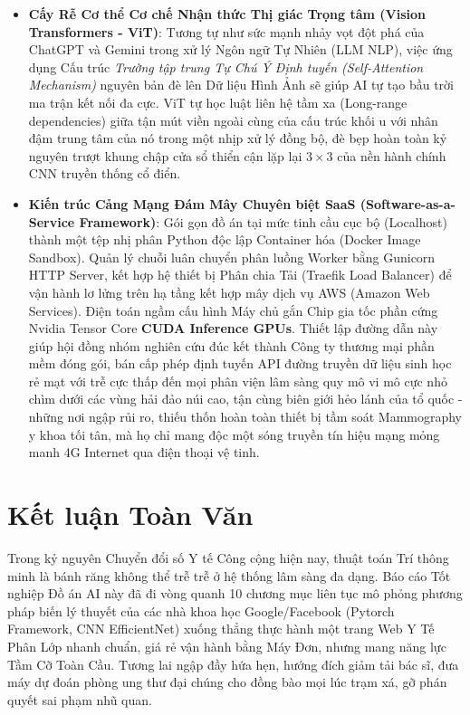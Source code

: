 \documentclass[conference,a4paper]{IEEEtran}
\begin{document}
\begin{itemize}
\item \textbf{Cấy Rễ Cơ thể Cơ chế Nhận thức Thị giác Trọng tâm (Vision Transformers - ViT)}: Tương tự như sức mạnh nhảy vọt đột phá của ChatGPT và Gemini trong xử lý Ngôn ngữ Tự Nhiên (LLM NLP), việc ứng dụng Cấu trúc \textit{Trường tập trung Tự Chú Ý Định tuyến (Self-Attention Mechanism)} nguyên bản đè lên Dữ liệu Hình Ảnh sẽ giúp AI tự tạo bầu trời ma trận kết nối đa cực. ViT tự học luật liên hệ tầm xa (Long-range dependencies) giữa tận mút viền ngoài cùng của cấu trúc khối u với nhân đậm trung tâm của nó trong một nhịp xử lý đồng bộ, đè bẹp hoàn toàn kỷ nguyên trượt khung chập cửa sổ thiển cận lặp lại $3 \times 3$ của nền hành chính CNN truyền thống cổ điển.
\item \textbf{Kiến trúc Cảng Mạng Đám Mây Chuyên biệt SaaS (Software-as-a-Service Framework)}: Gói gọn đồ án tại mức tinh cầu cục bộ (Localhost) thành một tệp nhị phân Python độc lập Container hóa (Docker Image Sandbox). Quản lý chuỗi luân chuyển phân luồng Worker bằng Gunicorn HTTP Server, kết hợp hệ thiết bị Phân chia Tải (Traefik Load Balancer) để vận hành lơ lửng trên hạ tầng kết hợp mây dịch vụ AWS (Amazon Web Services). Điện toán ngầm cấu hình Máy chủ gắn Chip gia tốc phần cứng Nvidia Tensor Core \textbf{CUDA Inference GPUs}. Thiết lập đường dẫn này giúp hội đồng nhóm nghiên cứu đúc kết thành Công ty thương mại phần mềm đóng gói, bán cấp phép định tuyến API đường truyền dữ liệu sinh học rẻ mạt với trễ cực thấp đến mọi phân viện lâm sàng quy mô vi mô cực nhỏ chìm dưới các vùng hải đảo núi cao, tận cùng biên giới hẻo lánh của tổ quốc - những nơi ngập rủi ro, thiếu thốn hoàn toàn thiết bị tầm soát Mammography y khoa tối tân, mà họ chỉ mang độc một sóng truyền tín hiệu mạng mỏng manh 4G Internet qua điện thoại vệ tinh.
\end{itemize}

\section{Kết luận Toàn Văn}
Trong kỷ nguyên Chuyển đổi số Y tế Công cộng hiện nay, thuật toán Trí thông minh là bánh răng không thể trễ trễ ở hệ thống lâm sàng đa dạng. Báo cáo Tốt nghiệp Đồ án AI này đã đi vòng quanh 10 chương mục liên tục mô phỏng phương pháp biến lý thuyết của các nhà khoa học Google/Facebook (Pytorch Framework, CNN EfficientNet) xuống thẳng thực hành một trang Web Y Tế Phân Lớp nhanh chuẩn, giá rẻ vận hành bằng Máy Đơn, nhưng mang năng lực Tầm Cỡ Toàn Cầu. Tương lai ngập đầy hứa hẹn, hướng đích giảm tải bác sĩ, đưa máy dự đoán phòng ung thư đại chúng cho đồng bào mọi lúc trạm xá, gỡ phán quyết sai phạm nhũ quan.
\end{document}
